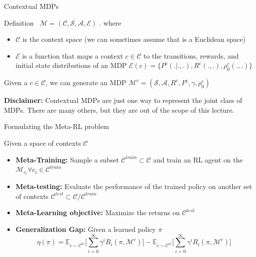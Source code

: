 \documentclass[aspectratio=169]{../latex_main/tntbeamer}  %
\begin{document}
\begin{frame}{Contextual MDPs}
    \begin{block}{Definition~}
        $ \mathcal{M} = ( \mathcal{C}, \mathcal{S}, \mathcal{A}, \mathcal{E} ) $ . 
        where
        \begin{itemize}
            \item $\mathcal{C}$ is the context space (we can sometimes assume that is a Euclidean space)
            \item $\mathcal{E}$ is a function that maps a context $c \in \mathcal{C}$ to the transitions, rewards, and initial state distributions of an MDP $\mathcal{E}(c) = \{ P^c(.|.,.), R^c(.,.), \rho_0^c(.,.)\}$
        \end{itemize} 

        \pause
        \vfill
        
        Given a $c \in \mathcal{C}$, we can generate an MDP $\mathcal {M}^c = ( \mathcal{S}, \mathcal{A}, R^c, P^c, \gamma,  \rho_0^c )$
        
    \end{block}

    \pause
    \vfill
    \textbf{Disclaimer: }Contextual MDPs are just one way to represent the joint class of MDPs. There are many others, but they are out of the scope of this lecture.

\end{frame}


\begin{frame}{Formulating the Meta-RL problem}

    Given a space of contexts $\mathcal{C}$
    
    \begin{itemize}
        \item \textbf{Meta-Training:} Sample a subset $\mathcal{C}^{train} \subset \mathcal{C}$ and train an RL agent on the $\mathcal{M}_{c_i} \forall c_i \in \mathcal{C}^{train}$
        \item \textbf{Meta-testing:} Evaluate the performance of the trained policy on another set of contexts $\mathcal{C}^{test} \subset \mathcal{C} / \mathcal{C}^{train}$
        \item \textbf{Meta-Learning objective:} Maximize the returns on $\mathcal{C}^{test}$
        \item \textbf{Generalization Gap:} Given a learned policy $\pi$ 
        \[
            \eta(\pi) = \mathbb{E}_{c \sim \mathcal{C}^{tr}}\big [ \sum_{i=0}^{\infty} \gamma^{i} R_i (\pi, \mathcal{M}^c)] - \mathbb{E}_{c \sim \mathcal{C}^{ts}}\big [\sum_{i=0}^{\infty} \gamma^{i} R_i (\pi, \mathcal{M}^c)]   
        \]
    \end{itemize}

\end{frame}
\end{document}

